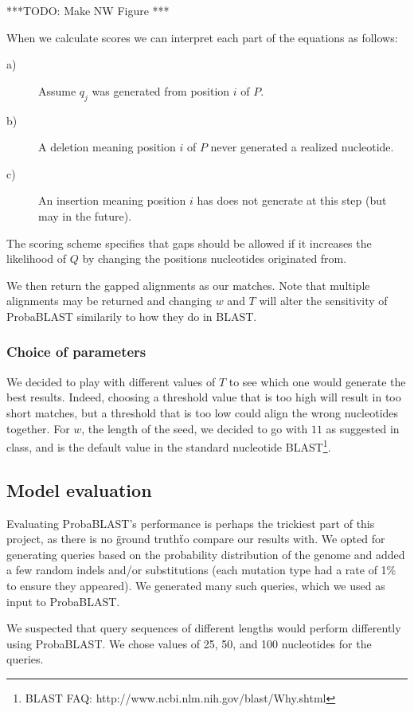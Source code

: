 \documentclass[12pt]{IEEEtran}
\begin{document}
***TODO: Make NW Figure ***

When we calculate scores we can interpret each part of the equations as follows:

\begin{description}
  \item[a)] Assume $q_j$ was generated from position $i$ of $P$.
  \item[b)] A deletion meaning position $i$ of $P$ never generated a realized nucleotide.
  \item[c)] An insertion meaning position $i$ has does not generate at this step (but may in the future).
\end{description}

The scoring scheme specifies that gaps should be allowed if it increases the likelihood of $Q$ by changing the positions nucleotides originated from.

We then return the gapped alignments as our matches. Note that multiple alignments may be returned and changing $w$ and $T$ will alter the sensitivity of ProbaBLAST similarily to how they do in BLAST.

\subsubsection{Choice of parameters}

We decided to play with different values of $T$ to see which one would generate the best results. Indeed, choosing a threshold value that is too high will result in too short matches, but a threshold that is too low could align the wrong nucleotides together.
For $w$, the length of the seed, we decided to go with $11$ as suggested in class, and is the default value in the standard nucleotide BLAST\footnote{BLAST FAQ: http://www.ncbi.nlm.nih.gov/blast/Why.shtml}.

\subsection{Model evaluation}

Evaluating ProbaBLAST's performance is perhaps the trickiest part of this project, as there is no \"ground truth\" to compare our results with. We opted for generating queries based on the probability distribution of the genome and added a few random indels and/or substitutions (each mutation type had a rate of 1\% to ensure they appeared). We generated many such queries, which we used as input to ProbaBLAST.

We suspected that query sequences of different lengths would perform differently using ProbaBLAST. We chose values of 25, 50, and 100 nucleotides for the queries. 
\end{document}
